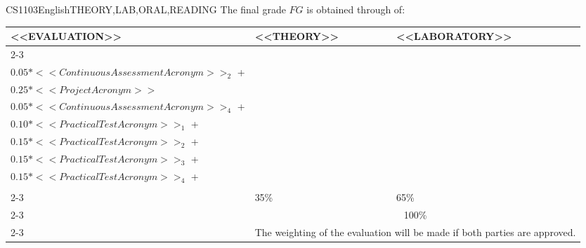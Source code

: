   \begin{evaluation}{CS1103}{English}{THEORY,LAB,ORAL,READING}
  The final grade $FG$ is obtained through of:
 
  \begin{tabularx}{0.9\textwidth}{|X|p{}|p{}|} \hline
    \multirow{4}{*}{\uppercase{<<Evaluation>>}} & \uppercase{<<Theory>>} & \uppercase{<<Laboratory>>} \\ \cline{2-3}
    & %
        \begin{minipage}{0.95\textwidth}
        \begin{tabular}{l}
            $0.05*<<ContinuousAssessmentAcronym>>_{1}$  + \\
            $0.05*<<ContinuousAssessmentAcronym>>_{2}$  + \\
            $0.25*<<ProjectAcronym>>$
            \end{tabular} 
        \end{minipage} 
    & %
        \begin{minipage}{0.95\textwidth}
        \begin{tabular}{l}
          $0.05*<<ContinuousAssessmentAcronym>>_{3}$ + \\
          $0.05*<<ContinuousAssessmentAcronym>>_{4}$ + \\
          $0.10*<<PracticalTestAcronym>>_{1}$ + \\
          $0.15*<<PracticalTestAcronym>>_{2}$ + \\
          $0.15*<<PracticalTestAcronym>>_{3}$ + \\
          $0.15*<<PracticalTestAcronym>>_{4}$ + \\
        \end{tabular} 
        \end{minipage}                 \\ \cline{2-3}
    & %
    35\% 
    & %
    65\% \\ \cline{2-3}
    & \multicolumn{2}{|c|}{100\%}  \\ \cline{2-3}
    & \multicolumn{2}{|c|}{The weighting of the evaluation will be made if both parties are approved.}  \\ \hline
    \end{tabularx}
      

\end{evaluation}
